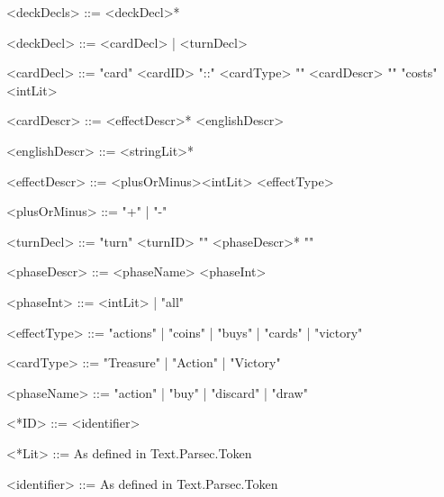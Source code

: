 
<deckDecls>  ::= <deckDecl>*

<deckDecl>   ::= <cardDecl> | <turnDecl>


<cardDecl>    ::= "card" <cardID> "::" <cardType> "{" <cardDescr> "}" "costs" <intLit>

<cardDescr>   ::= <effectDescr>* <englishDescr>

<englishDescr> ::= <stringLit>*

<effectDescr>  ::= <plusOrMinus><intLit> <effectType>

<plusOrMinus> ::= "+" | "-" 


<turnDecl>   ::= "turn" <turnID> "{" <phaseDescr>* "}" 

<phaseDescr> ::= <phaseName> <phaseInt>

<phaseInt>   ::= <intLit> | "all"


<effectType>  ::= "actions"   | "coins"  | "buys" | "cards" | "victory"

<cardType>    ::= "Treasure" | "Action" | "Victory"

<phaseName>   ::= "action"   | "buy"    | "discard" | "draw"

<*ID>         ::= <identifier>

<*Lit>      ::= As defined in Text.Parsec.Token

<identifier>  ::= As defined in Text.Parsec.Token

%
%
%
%
